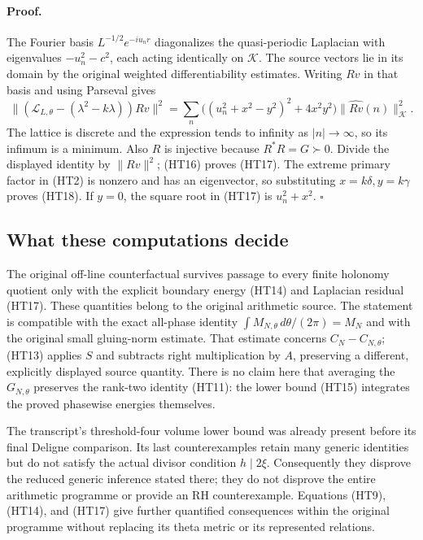 \paragraph{Proof.}
The Fourier basis $L^{-1/2}e^{-iu_nr}$ diagonalizes the quasi-periodic
Laplacian with eigenvalues $-u_n^2-c^2$, each acting identically on
$\mathcal K$.  The source vectors lie in its domain by the original
weighted differentiability estimates.  Writing $Rv$ in that basis and
using Parseval gives
\[
 \|(\mathscr L_{L,\theta}-(\lambda^2-k\lambda))Rv\|^2
 =\sum_n\bigl((u_n^2+x^2-y^2)^2+4x^2y^2\bigr)
 \|\widehat{Rv}(n)\|_{\mathcal K}^2.
\]
The lattice is discrete and the expression tends to infinity as
$|n|\to\infty$, so its infimum is a minimum.  Also $R$ is injective
because $R^*R=G\succ0$.  Divide the displayed identity by $\|Rv\|^2$;
(HT16) proves (HT17).  The extreme primary factor in (HT2) is nonzero
and has an eigenvector, so substituting $x=k\delta,y=k\gamma$ proves
(HT18).  If $y=0$, the square root in (HT17) is $u_n^2+x^2$.
\hfill$\square$

\subsection{What these computations decide}

The original off-line counterfactual survives passage to every finite
holonomy quotient only with the explicit boundary energy (HT14) and
Laplacian residual (HT17).  These quantities belong to the original
arithmetic source.  The statement is compatible with the exact
all-phase identity $\int M_{N,\theta}\,d\theta/(2\pi)=M_N$ and with
the original small gluing-norm estimate.  That estimate concerns
$C_N-C_{N,\theta}$; (HT13) applies $S$ and subtracts right multiplication
by $A$, preserving a different, explicitly displayed source quantity.
There is no claim here that averaging the $G_{N,\theta}$ preserves the
rank-two identity (HT11): the lower bound (HT15) integrates the proved
phasewise energies themselves.

The transcript's threshold-four volume lower bound was already present
before its final Deligne comparison.  Its last counterexamples retain
many generic identities but do not satisfy the actual divisor condition
$h\mid 2\xi$.  Consequently they disprove the reduced generic inference
stated there; they do not disprove the entire arithmetic programme or
provide an RH counterexample.  Equations (HT9), (HT14), and (HT17) give
further quantified consequences within the original programme without
replacing its theta metric or its represented relations.
